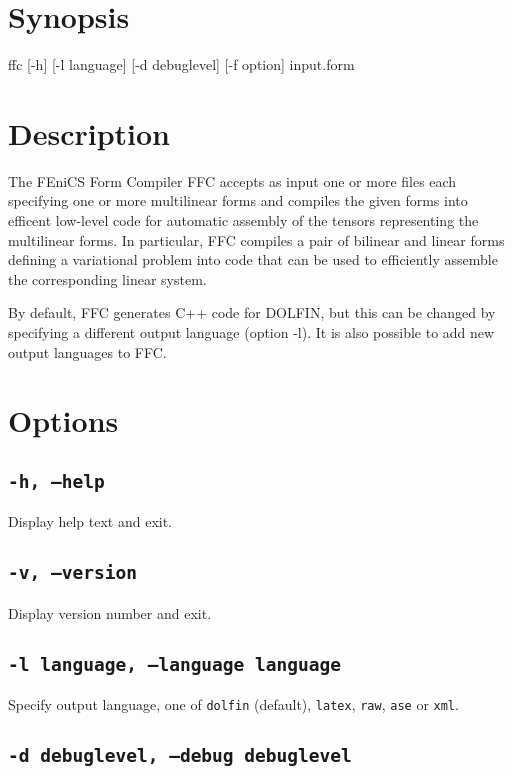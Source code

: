 \section{Synopsis}

\begin{code}
ffc [-h] [-l language] [-d debuglevel] [-f option] input.form
\end{code}

\section{Description}

The FEniCS Form Compiler FFC accepts as input one or more files each
specifying one or more multilinear forms and compiles the given forms
into efficent low-level code for automatic assembly of the tensors
representing the multilinear forms. In particular, FFC compiles a pair
of bilinear and linear forms defining a variational problem into code
that can be used to efficiently assemble the corresponding linear
system.

By default, FFC generates C++ code for DOLFIN, but this can be
changed by specifying a different output language (option -l).
It is also possible to add new output languages to FFC.

\section{Options}

\subsection{\texttt{-h, --help}}

Display help text and exit.

\subsection{\texttt{-v, --version}}

Display version number and exit.

\subsection{\texttt{-l language, --language language}}

Specify output language, one of 
\texttt{dolfin} (default),
\texttt{latex},
\texttt{raw},
\texttt{ase} or
\texttt{xml}.

\subsection{\texttt{-d debuglevel, --debug debuglevel}}

